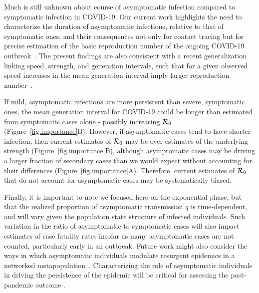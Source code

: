 Much is still unknown about course of asymptomatic infection compared to symptomatic infection in COVID-19. 
Our current work highlights the need to characterize the duration of asymptomatic infections, relative to that of symptomatic ones, and their consequences not only for contact tracing but for precise estimation of the basic reproduction number of the ongoing COVID-19 outbreak~\citep{park_preprint}.
The present findings are also consistent with a recent generalization linking speed, strength, and generation intervals, such that for a given observed speed increases in the mean generation interval imply larger reproduction number~\citep{park_2019practical}.

If mild, asymptomatic infections are more persistent than severe, symptomatic ones, the mean generation interval for COVID-19 could be longer than estimated from symptomatic cases alone - possibly increasing ${\cal{R}}_0$ (Figure~\ref{fig.importance}B).
However, if asymptomatic cases tend to have shorter infection, then current estimates of ${\cal{R}}_0$ may be over-estimates of the underlying strength (Figure~\ref{fig.importance}B), although asymptomatic cases may be driving a larger fraction of secondary cases than we would expect without accounting for their differences (Figure~\ref{fig.importance}A).
Therefore, current estimates of ${\cal{R}}_0$ that do not account for asymptomatic cases may be systematically biased.

Finally, it is important to note we focused here on the exponential phase, but that the realized proportion of asymptomatic transmission $q$ is time-dependent, and will vary given the population state structure of infected individuals. Such variation in the ratio of asymptomatic to symptomatic cases will also impact estimates of case fatality rates insofar as many asymptomatic cases are not counted, particularly early in an outbreak.
Future work might also consider the ways in which asymptomatic individuals modulate resurgent epidemics in a networked metapopulation~\citep{watts_pnas2005}.
Characterizing the role of asymptomatic individuals in driving the persistence of the epidemic will be critical for assessing the post-pandemic outcome \citep{lipsitch_preprint}.

